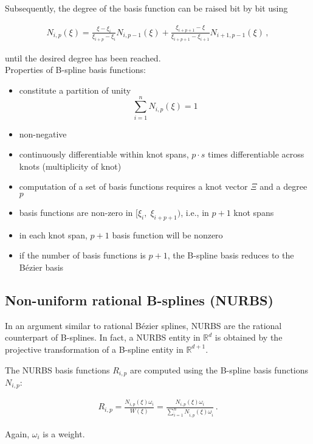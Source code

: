 \documentclass[11pt,a4paper]{article}
\begin{document}
Subsequently, the degree of the basis function can be raised bit by bit using

\begin{align}
N_{i,p}(\xi)=\frac{\xi-\xi_{i}}{\xi_{i+p}-\xi_{i}}N_{i,p-1}(\xi)+\frac{\xi_{i+p+1}-\xi}{\xi_{i+p+1}-\xi_{i+1}}N_{i+1,p-1}(\xi) \,,
\end{align}

until the desired degree has been reached. 
\\
	
		Properties of B-spline basis functions:
	\begin{itemize}
		\item constitute a partition of unity
		\[\sum_{i=1}^{n}N_{i,p}(\xi)=1\]
		\item non-negative
		\item continuously differentiable within knot spans, $p\cdot s$ times differentiable across knots (multiplicity of knot)
		\item computation of a set of basis functions requires a knot vector $\Xi$ and a degree $p$
		\item basis functions are non-zero in $[\xi_{i},\;\xi_{i+p+1})$, i.e., in $p+1$ knot spans
		\item in each knot span, $p+1$ basis function will be nonzero
		\item if the number of basis functions is $p+1$, the B-spline basis reduces to the Bézier basis
	\end{itemize}
	
	

\subsection{Non-uniform rational B-splines (NURBS)}

In an argument similar to rational Bézier splines, NURBS are the rational counterpart of B-splines. In fact, a NURBS entity in $\mathbb{R}^{d}$ is obtained by the projective transformation of a B-spline entity in $\mathbb{R}^{d+1}$.

The NURBS basis functions $R_{i,p}$ are computed using the B-spline basis functions $ N_{i,p} $:

\begin{align}
R_{i,p}=\frac{N_{i,p}(\xi)\omega_{i}}{W(\xi)}=\frac{N_{i,p}(\xi)\omega_{i}}{\sum_{\hat{i}=1}^{n}N_{\hat{i},p}(\xi)\omega_{\hat{i}}} \,.
\end{align}

Again, $\omega_i$ is a weight.
\end{document}
